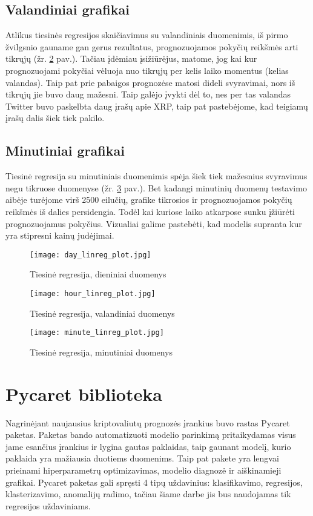 \documentclass[12pt,a4paper]{article}
\begin{document}
\subsection{Valandiniai grafikai}
Atlikus tiesinės regresijos skaičiavimus su valandiniais duomenimis, iš pirmo žvilgsnio gauname gan gerus rezultatus, prognozuojamos pokyčių reikšmės arti tikrųjų (žr. \ref{hourlinreg} pav.). Tačiau įdėmiau įsižiūrėjus, matome, jog kai kur prognozuojami pokyčiai vėluoja nuo tikrųjų per kelis laiko momentus (kelias valandas). Taip pat prie pabaigos prognozėse matosi dideli svyravimai, nors iš tikrųjų jie buvo daug mažesni. Taip galėjo įvykti dėl to, nes per tas valandas Twitter buvo paskelbta daug įrašų apie XRP, taip pat pastebėjome, kad teigiamų įrašų dalis šiek tiek pakilo.

\subsection{Minutiniai grafikai}
Tiesinė regresija su minutiniais duomenimis spėja šiek tiek mažesnius svyravimus negu tikruose duomenyse (žr. \ref{minutelinreg} pav.). Bet kadangi minutinių duomenų testavimo aibėje turėjome virš 2500 eilučių, grafike tikrosios ir prognozuojamos pokyčių reikšmės iš dalies persidengia. Todėl kai kuriose laiko atkarpose sunku įžiūrėti prognozuojamus pokyčius. Vizualiai galime pastebėti, kad modelis supranta kur yra stipresni kainų judėjimai.

\begin{figure}[!h]
\centering
\caption{Tiesinė regresija, dieniniai duomenys}
\label{daylinreg}
\texttt{[image: day\_linreg\_plot.jpg]}
\end{figure}

\begin{figure}[!h]
\centering
\caption{Tiesinė regresija, valandiniai duomenys}
\label{hourlinreg}
\texttt{[image: hour\_linreg\_plot.jpg]}
\end{figure}

\begin{figure}[!h]
\centering
\caption{Tiesinė regresija, minutiniai duomenys}
\label{minutelinreg}
\texttt{[image: minute\_linreg\_plot.jpg]}
\end{figure}

\newpage
\clearpage

\section{Pycaret biblioteka}
Nagrinėjant naujausius kriptovaliutų prognozės įrankius buvo rastas Pycaret \cite{pycaret} paketas. Paketas bando automatizuoti modelio parinkimą pritaikydamas visus jame esančius įrankius ir lygina gautas paklaidas, taip gaunant modelį, kurio paklaida yra mažiausia duotiems duomenims. Taip pat pakete yra lengvai prieinami hiperparametrų optimizavimas, modelio diagnozė ir aiškinamieji grafikai. Pycaret paketas gali spręsti 4 tipų uždavinius: klasifikavimo, regresijos, klasterizavimo, anomalijų radimo, tačiau šiame darbe jis bus naudojamas tik regresijos uždaviniams.
\end{document}
